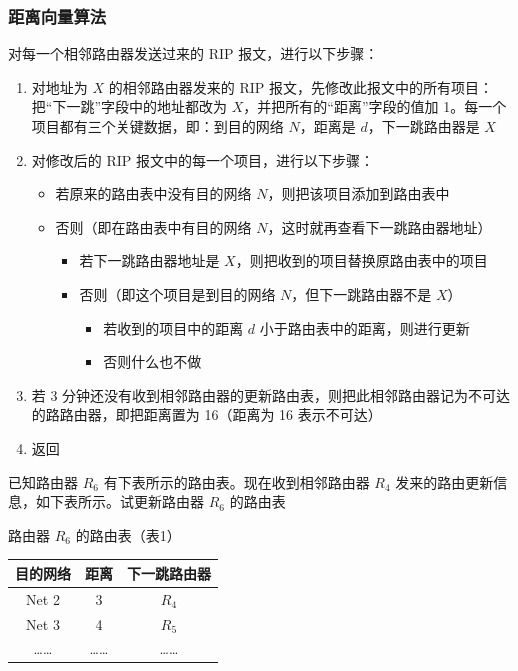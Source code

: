 \documentclass[cs4size,a4paper,10pt]{ctexart}
\begin{document}
	\subsubsection{距离向量算法}
	对每一个相邻路由器发送过来的 RIP 报文，进行以下步骤：
	\begin{enumerate}[label=\arabic*.]
		\item 对地址为 $X$ 的相邻路由器发来的 RIP 报文，先修改此报文中的所有项目：把“下一跳”字段中的地址都改为 $X$，并把所有的“距离”字段的值加 1。每一个项目都有三个关键数据，即：到目的网络 $N$，距离是 $d$，下一跳路由器是 $X$
		\item 对修改后的 RIP 报文中的每一个项目，进行以下步骤： 
		\begin{itemize}
			\item 若原来的路由表中没有目的网络 $N$，则把该项目添加到路由表中
			\item 否则（即在路由表中有目的网络 $N$，这时就再查看下一跳路由器地址）
			\begin{itemize}
				\item 若下一跳路由器地址是 $X$，则把收到的项目替换原路由表中的项目 
				\item 否则（即这个项目是到目的网络 $N$，但下一跳路由器不是 $X$）
				\begin{itemize}
					\item 若收到的项目中的距离 $d$ 小于路由表中的距离，则进行更新
					\item 否则什么也不做
				\end{itemize}
			\end{itemize}
		\end{itemize}
		\item 若 3 分钟还没有收到相邻路由器的更新路由表，则把此相邻路由器记为不可达的路路由器，即把距离置为 16（距离为 16 表示不可达）
		\item 返回
	\end{enumerate}

	已知路由器 $R_6$ 有下表所示的路由表。现在收到相邻路由器 $R_4$ 发来的路由更新信息，如下表所示。试更新路由器 $R_6$ 的路由表

	路由器 $R_6$ 的路由表（表1）
	\begin{table}[H]
		\centering
		\begin{tabular}{|c|c|c|}
		\hline
		目的网络  & 距离 & 下一跳路由器 \\ \hline
		Net 2 & 3  & $R_4$  \\ \hline
		Net 3 & 4  & $R_5$  \\ \hline
		……    & …… & ……     \\ \hline
		\end{tabular}
	\end{table}
\end{document}
